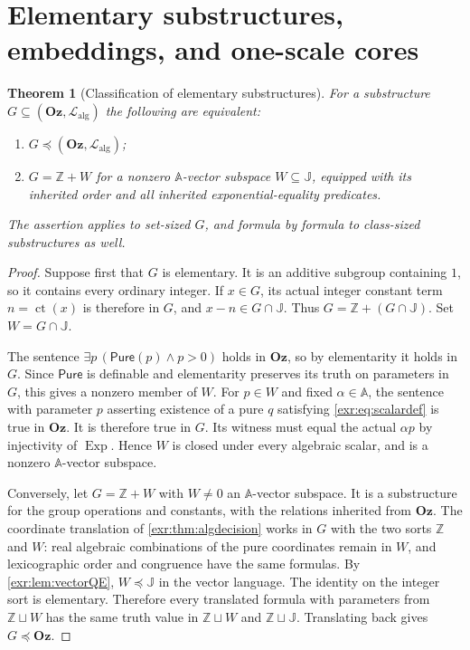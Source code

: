 \documentclass[11pt,letterpaper]{article}
\numberwithin{equation}{section}
\newtheorem{theorem}{Theorem}[section]
\theoremstyle{definition}
\theoremstyle{remark}
\newcommand{\Oz}{\mathbf{Oz}}
\newcommand{\Z}{\mathbb Z}
\newcommand{\A}{\mathbb A}
\newcommand{\J}{\mathbb J}
\newcommand{\Lalg}{\mathcal L_{\mathrm{alg}}}
\newcommand{\ct}{\operatorname{ct}}
\newcommand{\Exp}{\operatorname{Exp}}
\newcommand{\Pure}{\mathsf{Pure}}
\begin{document}
\section{Elementary substructures, embeddings, and one-scale cores}\label{exr:sec:cores}
\begin{theorem}[Classification of elementary substructures]\label{exr:thm:elementary}
For a substructure $G\subseteq(\Oz,\Lalg)$ the following are equivalent:
\begin{enumerate}[label=(\roman*)]
\item $G\preccurlyeq(\Oz,\Lalg)$;
\item $G=\Z+W$ for a nonzero $\A$-vector subspace $W\subseteq\J$, equipped with its
inherited order and all inherited exponential-equality predicates.
\end{enumerate}
The assertion applies to set-sized $G$, and formula by formula to class-sized
substructures as well.
\end{theorem}
\begin{proof}
Suppose first that $G$ is elementary. It is an additive subgroup containing $1$,
so it contains every ordinary integer. If $x\in G$, its actual integer constant
term $n=\ct(x)$ is therefore in $G$, and $x-n\in G\cap\J$. Thus
$G=\Z+(G\cap\J)$. Set $W=G\cap\J$.

The sentence $\exists p\,(\Pure(p)\land p>0)$ holds in $\Oz$, so by elementarity
it holds in $G$. Since $\Pure$ is definable and elementarity preserves its truth
on parameters in $G$, this gives a nonzero member of $W$.
For $p\in W$ and fixed $\alpha\in\A$, the sentence with parameter $p$ asserting
existence of a pure $q$ satisfying \eqref{exr:eq:scalardef} is true in $\Oz$. It is
therefore true in $G$. Its witness must equal the actual $\alpha p$ by injectivity
of $\Exp$. Hence $W$ is closed under every algebraic scalar, and is a nonzero
$\A$-vector subspace.

Conversely, let $G=\Z+W$ with $W\ne0$ an $\A$-vector subspace. It is a
substructure for the group operations and constants, with the relations inherited
from $\Oz$. The coordinate translation of \cref{exr:thm:algdecision} works in $G$
with the two sorts $\Z$ and $W$: real algebraic combinations of the pure
coordinates remain in $W$, and lexicographic order and congruence have the same
formulas. By \cref{exr:lem:vectorQE}, $W\preccurlyeq\J$ in the vector language. The
identity on the integer sort is elementary. Therefore every translated formula
with parameters from $\Z\sqcup W$ has the same truth value in
$\Z\sqcup W$ and $\Z\sqcup\J$. Translating back gives $G\preccurlyeq\Oz$.
\end{proof}
\end{document}
